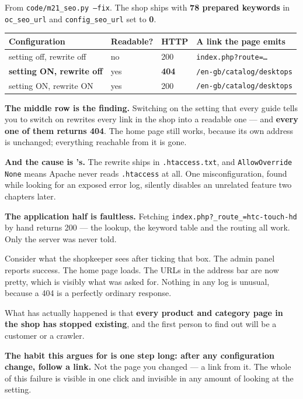 \begin{measured}
From \texttt{code/m21\_seo.py --fix}. The shop ships with \textbf{78 prepared
keywords} in \texttt{oc\_seo\_url} and \texttt{config\_seo\_url} set to
\textbf{0}.

\begin{longtable}{@{}L{4.8cm}L{2.2cm}L{1.6cm}L{4.8cm}@{}}
\toprule
{}
\textbf{Configuration} & \textbf{Readable?} & \textbf{HTTP} &
\textbf{A link the page emits} \\
\midrule
\endhead
setting off, rewrite off & no & 200 & \texttt{index.php?route=\dots} \\
\textbf{setting ON, rewrite off} & yes & \textbf{404} &
\texttt{/en-gb/catalog/desktops} \\
setting ON, rewrite ON & yes & 200 & \texttt{/en-gb/catalog/desktops} \\
\bottomrule
\end{longtable}

\smallskip
\textbf{The middle row is the finding.} Switching on the setting that every
guide tells you to switch on rewrites every link in the shop into a readable
one --- and \textbf{every one of them returns 404}. The home page still works,
because its own address is unchanged; everything reachable from it is gone.

\smallskip
\textbf{And the cause is 's.} The rewrite ships in
\texttt{.htaccess.txt}, and \texttt{AllowOverride None} means Apache never
reads \texttt{.htaccess} at all. One misconfiguration, found while looking for
an exposed error log, silently disables an unrelated feature two chapters
later.

\smallskip
\textbf{The application half is faultless.} Fetching
\texttt{index.php?\_route\_=htc-touch-hd} by hand returns 200 --- the lookup,
the keyword table and the routing all work. Only the server was never told.
\end{measured}

\begin{alertbox}
Consider what the shopkeeper sees after ticking that box. The admin panel
reports success. The home page loads. The URLs in the address bar are now
pretty, which is visibly what was asked for. Nothing in any log is unusual,
because a 404 is a perfectly ordinary response.

\smallskip
What has actually happened is that \textbf{every product and category page in
the shop has stopped existing}, and the first person to find out will be a
customer or a crawler.

\smallskip
\textbf{The habit this argues for is one step long: after any configuration
change, follow a link.} Not the page you changed --- a link from it. The whole
of this failure is visible in one click and invisible in any amount of looking
at the setting.
\end{alertbox}

